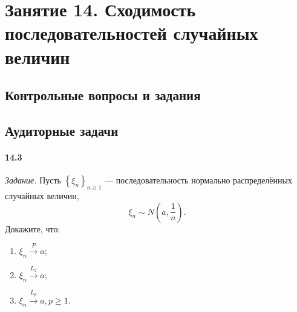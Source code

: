\chapter*{Занятие 14. Сходимость последовательностей случайных величин}

\section*{Контрольные вопросы и задания}

\section*{Аудиторные задачи}

\subsubsection*{14.3}

\textit{Задание.} Пусть $ \left\{ \xi_n \right\}_{n \geq 1}$ --- последовательность нормально распределённых случайных величин,
$$ \xi_n \sim N \left( a, \frac{1}{n} \right).$$
Докажите, что:
\begin{enumerate}[label=\alph*)]
\item $ \xi_n \overset{P}{ \rightarrow } a;$
\item $ \xi_n \overset{L_2}{ \rightarrow } a;$
\item $ \xi_n \overset{L_p}{ \rightarrow } a, p \geq 1$.
\end{enumerate}

